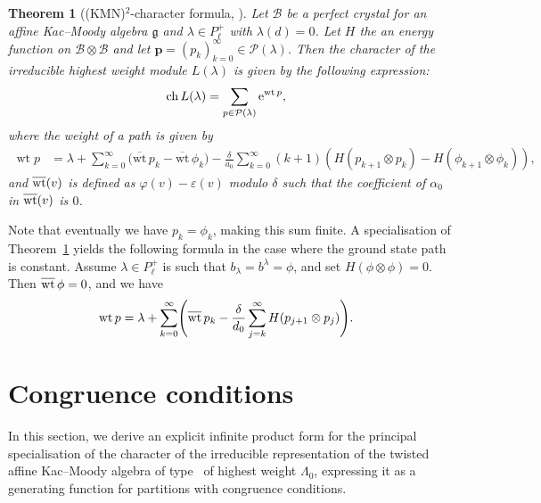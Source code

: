 \documentclass[pdftex]{sigma}
\numberwithin{equation}{section}
\newtheorem{Theorem}{Theorem}[section]
\theoremstyle{definition}
\begin{document}
\begin{Theorem}[(KMN)$^2$-character formula, \cite{KMN92}]\label{thm:KMN2}
Let $\mathcal{B}$ be a perfect crystal for an affine Kac--Moody algebra $\mathfrak{g}$ and $\lambda \in P_\ell^+$ with $\lambda(d)=0$. Let $H$ the an energy function on $\mathcal{B} \otimes \mathcal{B}$ and let $\mathbf{p} = (p_k)_{k=0}^{\infty} \in \mathcal{P}(\lambda)$. Then the character of the irreducible highest weight module $L(\lambda)$ is given by the following expression:
\begin{align*}
\operatorname{ch}L(\lambda)
&= \sum_{p \in \mathcal{P}(\lambda)} {\rm e}^{\operatorname{wt}p},
\end{align*}
where the weight of a path is given by
\begin{align*}
\operatorname{wt}p
&= \lambda + \sum_{k=0}^{\infty} \bigl( \overline{\mathrm{wt}}\,p_k - \overline{\mathrm{wt}}\,\phi_k \bigr) - \frac{\delta}{a_0} \sum_{k=0}^{\infty} (k+1) ( H(p_{k+1} \otimes p_k) - H(\phi_{k+1} \otimes \phi_k) ),
\end{align*}
and $\overline{{\rm wt}}(v)$ is defined as $\varphi(v) - \varepsilon(v)$ modulo $\delta$ such that the coefficient of $\alpha_0$ in $\overline{{\rm wt}}(v)$ is $0$.
\end{Theorem}

Note that eventually we have $p_k = \phi_k$, making this sum finite. A specialisation of Theorem~\ref{thm:KMN2} yields the following formula in the case where the ground state path is constant. Assume $\lambda \in P^+_\ell$ is such that $b_\lambda = b^\lambda = \phi$, and set $H(\phi \otimes \phi) = 0$. Then $\overline{{\rm wt}}\, \phi = 0$, and we have
\begin{align*}
\operatorname{wt}p &= \lambda + \sum_{k=0}^{\infty} \Biggl( \overline{{\rm wt}}\,p_k - \frac{\delta}{d_0} \sum_{j=k}^{\infty} H(p_{j+1} \otimes p_j) \Biggr).
\end{align*}

\section{Congruence conditions}\label{section:cong}

In this section, we derive an explicit infinite product form for the principal specialisation of the character of the irreducible representation of the twisted affine Kac--Moody algebra of type~ of highest weight $\Lambda_0$, expressing it as a generating function for partitions with congruence conditions.
\end{document}
